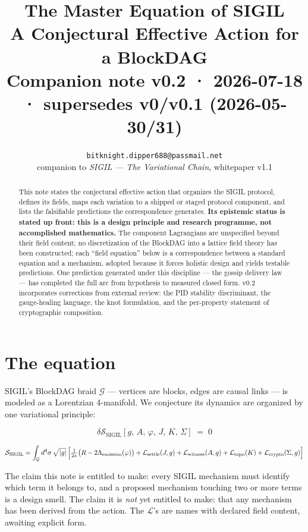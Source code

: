 \documentclass[10pt,a4paper]{article}
\title{\textcolor{ink}{\LARGE The Master Equation of SIGIL}\\[5pt]
\large A Conjectural Effective Action for a BlockDAG\\[4pt]
\normalsize Companion note v0.2 · 2026-07-18 · supersedes v0/v0.1 (2026-05-30/31)}
\author{\texttt{bitknight.dipper688@passmail.net}\\[2pt]
\normalsize companion to \emph{SIGIL — The Variational Chain}, whitepaper v1.1}
\date{}
\newcommand{\SSIGIL}{\mathcal{S}_{\mathrm{SIGIL}}}
\begin{document}
\maketitle

\begin{abstract}
\noindent
This note states the conjectural effective action that organizes the SIGIL protocol,
defines its fields, maps each variation to a shipped or staged protocol component, and
lists the falsifiable predictions the correspondence generates. \textbf{Its epistemic
status is stated up front: this is a design principle and research programme, not
accomplished mathematics.} The component Lagrangians are unspecified beyond their field
content; no discretization of the BlockDAG into a lattice field theory has been
constructed; each ``field equation'' below is a correspondence between a standard
equation and a mechanism, adopted because it forces holistic design and yields testable
predictions. One prediction generated under this discipline — the gossip delivery law —
has completed the full arc from hypothesis to measured closed form. v0.2 incorporates
corrections from external review: the PID stability discriminant, the gauge-healing
language, the knot formulation, and the per-property statement of cryptographic
composition.
\end{abstract}

\section{The equation}

SIGIL's BlockDAG braid $\mathcal{G}$ — vertices are blocks, edges are causal links — is
modeled as a Lorentzian 4-manifold. We conjecture its dynamics are organized by one
variational principle:

\begin{equation}
\boxed{\;\delta \SSIGIL[g,\,A,\,\varphi,\,J,\,K,\,\Sigma] \;=\; 0\;}
\end{equation}

\begin{equation}
\SSIGIL = \int_{\mathcal{G}} d^{4}\sigma\, \sqrt{|g|}\,
\Bigl[
\tfrac{1}{2\kappa}\bigl(R - 2\Lambda_{\mathrm{emission}}(\varphi)\bigr)
+ \mathcal{L}_{\mathrm{settle}}(J,g)
+ \mathcal{L}_{\mathrm{witness}}(A,g)
+ \mathcal{L}_{\mathrm{topo}}(K)
+ \mathcal{L}_{\mathrm{crypto}}(\Sigma,g)
\Bigr]
\end{equation}

The claim this note is entitled to make: every SIGIL mechanism must identify which term
it belongs to, and a proposed mechanism touching two or more terms is a design smell.
The claim it is \emph{not} yet entitled to make: that any mechanism has been derived
from the action. The $\mathcal{L}$'s are names with declared field content, awaiting
explicit form.
\end{document}
